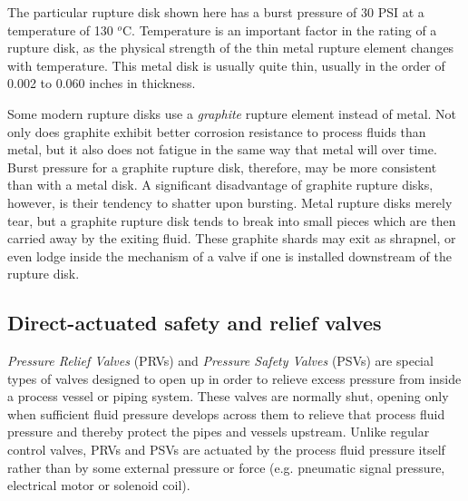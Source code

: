 The particular rupture disk shown here has a burst pressure of 30 PSI at a temperature of 130 $^{o}$C.  Temperature is an important factor in the rating of a rupture disk, as the physical strength of the thin metal rupture element changes with temperature.  This metal disk is usually quite thin, usually in the order of 0.002 to 0.060 inches in thickness.      

Some modern rupture disks use a \textit{graphite} rupture element instead of metal.  Not only does graphite exhibit better corrosion resistance to process fluids than metal, but it also does not fatigue in the same way that metal will over time.  Burst pressure for a graphite rupture disk, therefore, may be more consistent than with a metal disk.  A significant disadvantage of graphite rupture disks, however, is their tendency to shatter upon bursting.  Metal rupture disks merely tear, but a graphite rupture disk tends to break into small pieces which are then carried away by the exiting fluid.  These graphite shards may exit as shrapnel, or even lodge inside the mechanism of a valve if one is installed downstream of the rupture disk.    




\filbreak
\subsection{Direct-actuated safety and relief valves}

\textit{Pressure Relief Valves} (PRVs) and \textit{Pressure Safety Valves} (PSVs) are special types of valves designed to open up in order to relieve excess pressure from inside a process vessel or piping system.  These valves are normally shut, opening only when sufficient fluid pressure develops across them to relieve that process fluid pressure and thereby protect the pipes and vessels upstream.  Unlike regular control valves, PRVs and PSVs are actuated by the process fluid pressure itself rather than by some external pressure or force (e.g. pneumatic signal pressure, electrical motor or solenoid coil).            

